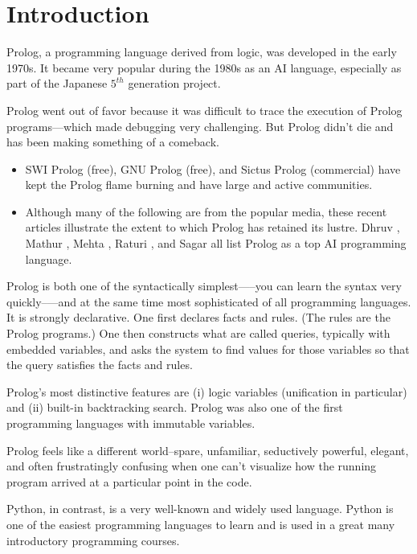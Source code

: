 \section{Introduction}

Prolog, a programming language derived from logic, was developed in the early 1970s. It became very popular during the 1980s as an AI language, especially as part of the Japanese $5^{th}$ generation project.

Prolog went out of favor because it was difficult to trace the execution of Prolog programs---which made debugging very challenging. But Prolog didn't die and has been making something of a comeback. 
\begin{itemize}
    \item SWI Prolog (free), GNU Prolog (free), and Sictus Prolog (commercial) have kept the Prolog flame burning and have large and active communities.
    \item  Although many of the following are from the popular media, these recent articles illustrate the extent to which Prolog has retained its lustre. Dhruv \cite{Dhruv2018}, Mathur \cite{Mathur2018}, Mehta \cite{Mehta2018},  Raturi \cite{Raturi2019}, and Sagar \cite{Sagar2019} all list Prolog as a top AI programming language. 
\end{itemize}

Prolog is both one of the syntactically simplest—--you can learn the syntax very quickly--—and at the same time most sophisticated of all programming languages. It is strongly declarative. One first declares facts and rules. (The rules are the Prolog programs.) One then constructs what are called queries, typically with embedded variables, and asks the system to find values for those variables so that the query satisfies the facts and rules. 

Prolog's most distinctive features are (i) logic variables (unification in particular) and (ii) built-in backtracking search. Prolog was also one of the first programming languages with immutable variables. 

Prolog feels like a different world--spare, unfamiliar, seductively powerful, elegant, and often frustratingly confusing when one can't visualize how the running program arrived at a particular point in the code. 

Python, in contrast, is a very well-known and widely used language. Python is one of the easiest programming languages to learn and is used in a great many introductory programming courses. 

